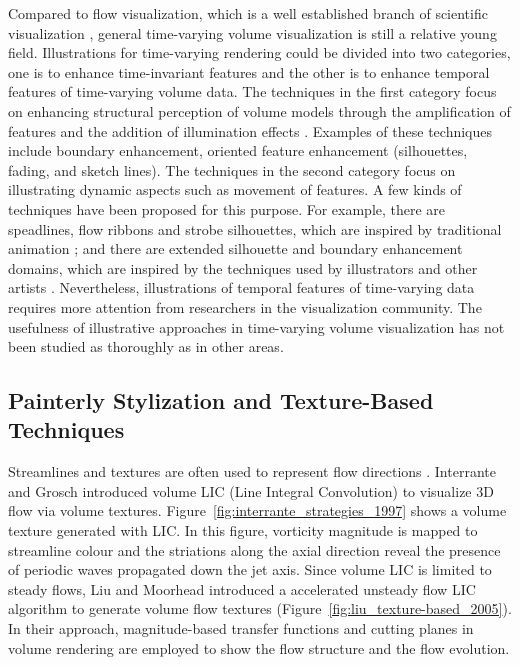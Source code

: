 Compared to flow visualization, which is a well established branch of scientific visualization \cite{brambilla_illustrative_2012}, general time-varying volume visualization is still a relative young field.
Illustrations for time-varying rendering could be divided into two categories, one is to enhance time-invariant features and the other is to enhance temporal features of time-varying volume data. The techniques in the first category focus on enhancing structural perception of volume models through the amplification of features and the addition of illumination effects \cite{rheingans_volume_2001} \cite{joshi_illustration-inspired_2005}. Examples of these techniques include boundary enhancement, oriented feature enhancement (silhouettes, fading, and sketch lines). The techniques in the second category focus on illustrating dynamic aspects such as movement of features. A few kinds of techniques have been proposed for this purpose. For example, there are speadlines, flow ribbons and strobe silhouettes, which are inspired by traditional animation \cite{joshi_illustration-inspired_2005} \cite{joshi_evaluation_2008} \cite{joshi_case_2009}; and there are extended silhouette and boundary enhancement domains, which are inspired by the techniques used by illustrators and other artists \cite{svakhine_illustration_2005}. Nevertheless, illustrations of temporal features of time-varying data requires more attention from researchers in the visualization community. The usefulness of illustrative approaches in time-varying volume visualization has not been studied as thoroughly as in other areas.

\subsection{Painterly Stylization and Texture-Based Techniques \label{painterly_rendering}}
Streamlines and textures are often used to represent flow directions \cite{urnessy_techniques_2004}. Interrante and Grosch \cite{interrante_strategies_1997} introduced volume LIC (Line Integral Convolution) to visualize 3D flow via volume textures. Figure~\ref{fig:interrante_strategies_1997} shows a volume texture generated with LIC. In this figure, vorticity magnitude is mapped to streamline colour and the striations along the axial direction reveal the presence of periodic waves propagated down the jet axis. Since volume LIC is limited to steady flows, Liu and Moorhead \cite{liu_texture-based_2005} introduced a accelerated unsteady flow LIC algorithm to generate volume flow textures (Figure~\ref{fig:liu_texture-based_2005}). In their approach, magnitude-based transfer functions and cutting planes in volume rendering are employed to show the flow structure and the flow evolution.

